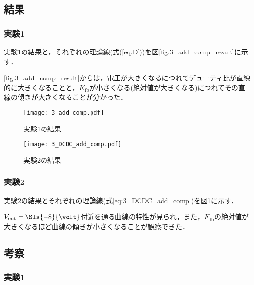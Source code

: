 \documentclass[1_power_supply.tex]{subfiles}
\begin{document}
  \subsection{結果}

    \subsubsection{実験1}

      実験1の結果と，それぞれの理論線(式(\ref{eq:D}))を図\ref{fig:3_add_comp_result}に示す．

      \ref{fig:3_add_comp_result}からは，電圧が大きくなるにつれてデューティ比が直線的に大きくなることと，$K_\mathrm{fb}$が小さくなる(絶対値が大きくなる)につれてその直線の傾きが大きくなることが分かった．


      \begin{figure}[htbp]
        \begin{minipage}{0.45\columnwidth}
          \centering
          \texttt{[image: 3\_add\_comp.pdf]}
          \caption{実験1の結果}\label{fig:3_add_comp_result}
        \end{minipage}
        \begin{minipage}{0.45\columnwidth}
          \centering
          \texttt{[image: 3\_DCDC\_add\_comp.pdf]}
          \caption{実験2の結果}\label{fig:3_DCDC_add_comp_result}
        \end{minipage}
      \end{figure}

    \subsubsection{実験2}

      実験2の結果とそれぞれの理論線(式\ref{eq:3_DCDC_add_comp})を図\ref{fig:3_DCDC_add_comp_result}に示す．

      $V_\mathrm{out}=\SIs{-8}{\volt}$付近を通る曲線の特性が見られ，また，$K_\mathrm{fb}$の絶対値が大きくなるほど曲線の傾きが小さくなることが観察できた．

  \subsection{考察}

    \subsubsection{実験1}
\end{document}

